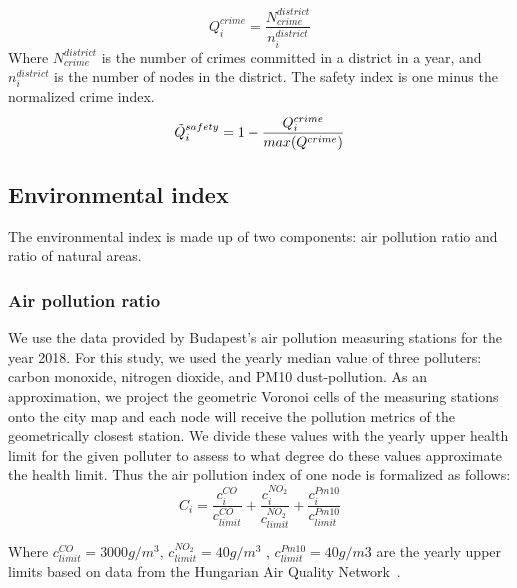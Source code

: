 $$Q_i^{crime}=\frac{N^{district}_{crime}}{n_i^{district}}$$
Where $N^{district}_{crime}$ is the number of crimes committed in a district in a year, and $n_i^{district}$ is the number of nodes in the district. The safety index is one minus the normalized crime index.
\begin{equation}
	\Tilde{Q}_i^{safety}=1-\frac{Q_i^{crime}}{max(Q^{crime})}
\end{equation}

\subsection{Environmental index} \label{environment}

The environmental index is made up of two components: air pollution ratio and ratio of natural areas.

\subsubsection{Air pollution ratio}
We use the data provided by Budapest’s air pollution measuring stations for the year 2018. For this study, we used the yearly median value of three polluters: carbon monoxide, nitrogen dioxide, and PM10 dust-pollution.
As an approximation, we project the geometric Voronoi cells of the measuring stations onto the city map and each node will receive the pollution metrics of the geometrically closest station. We divide these values with the yearly upper health limit for the given polluter to assess to what degree do these values approximate the health limit. Thus the air pollution index of one node is formalized as follows:
$$C_i=\frac{c_i^{CO}}{c_{limit}^{CO}}+\frac{c_i^{NO_2}}{c_{limit}^{NO_2}}+\frac{c_i^{Pm10}}{c_{limit}^{Pm10}}$$

Where $c^{CO}_{limit}=3000 g/m^3$, $c^{NO_2}_{limit}=40 g/m^3$ , $c^{Pm10}_{limit}=40 g/m3$ are the yearly upper limits based on data from the Hungarian Air Quality Network~\cite{HU2019Pollution}.

